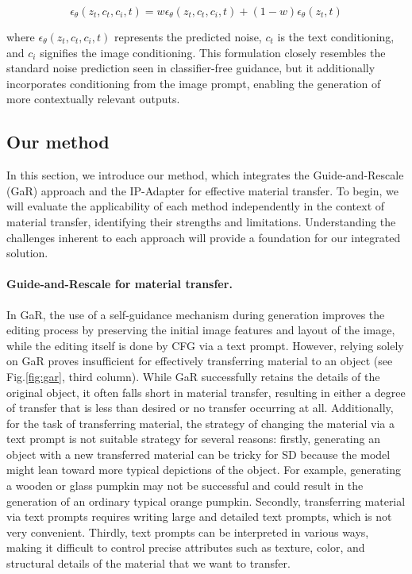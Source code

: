 \vspace{-0.5cm}
\begin{equation}
  \hat{\epsilon}_{\theta}(z_{t}, c_t, c_i, t) = w\epsilon_{\theta}(z_{t}, c_t, c_i, t) + (1-w)\epsilon_{\theta}(z_{t}, t) 
  \label{eq:ip}
\end{equation}

where $\epsilon_{\theta}(z_{t}, c_{t}, c_{i}, t)$ represents the predicted noise, $c_{t}$ is the text conditioning, and $c_{i}$ signifies the image conditioning. This formulation closely resembles the standard noise prediction seen in classifier-free guidance, but it additionally incorporates conditioning from the image prompt, enabling the generation of more contextually relevant outputs.


\subsection{Our method}
In this section, we introduce our method, which integrates the Guide-and-Rescale (GaR) approach and the IP-Adapter for effective material transfer. To begin, we will evaluate the applicability of each method independently in the context of material transfer, identifying their strengths and limitations. Understanding the challenges inherent to each approach will provide a foundation for our integrated solution. 


\paragraph{Guide-and-Rescale for material transfer.} In GaR, the use of a self-guidance mechanism during generation improves the editing process by preserving the initial image features and layout of the image, while the editing itself is done by CFG via a text prompt. However, relying solely on GaR proves insufficient for effectively transferring material to an object (see Fig.\ref{fig:gar}, third column). While GaR successfully retains the details of the original object, it often falls short in material transfer, resulting in either a degree of transfer that is less than desired or no transfer occurring at all. Additionally, for the task of transferring material, the strategy of changing the material via a text prompt is not suitable strategy for several reasons: firstly, generating an object with a new transferred material can be tricky for SD because the model might lean toward more typical depictions of the object. For example, generating a wooden or glass pumpkin may not be successful and could result in the generation of an ordinary typical orange pumpkin. Secondly, transferring material via text prompts requires writing large and detailed text prompts, which is not very convenient. Thirdly, text prompts can be interpreted in various ways, making it difficult to control precise attributes such as texture, color, and structural details of the material that we want to transfer.

